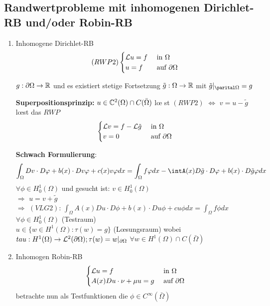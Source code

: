 \subsection{Randwertprobleme mit inhomogenen Dirichlet-RB und/oder Robin-RB}
\begin{enumerate}
  \item Inhomogene Dirichlet-RB\\
    \[(RWP2)\begin{cases}
    \mathcal{L} u=f & \mbox{ in }\Omega\\
    u=f & \mbox{ auf }\partial\Omega
    \end{cases}\]

    $g:\partial\Omega \rightarrow \mathbb{R}$ und es existiert stetige Fortsetzung
    $\tilde g:\Omega\rightarrow \mathbb{R}$ mit $\tilde g|_{\parital\Omega}=g$

    \textbf{Superpositionsprinzip:} $u\in\mathbb{C}^2(\Omega)\cap C(\bar\Omega)$ l\oe
    st $(RWP2)$ $\Leftrightarrow$
    $v=u-\tilde g$ l\oe st das $RWP$
    \[\begin{cases}
    \mathcal{L} v=f-\mathcal{L}\tilde g & \mbox{ in }\Omega\\
    v=0 & \mbox{ auf }\partial\Omega
    \end{cases}\]

    \textbf{Schwach Formulierung}:
    \[\int_\Omega Dv\cdot D\phi+b(x)\cdot Dv\phi +c(x)v\phi dx =\int_\Omega
    f\phi dx - \intA(x)D\tilde g \cdot D\phi + b(x)\cdot D\tilde g \phi dx\]
    $\forall \phi \in H^1_0(\Omega)$ und gesucht ist: $v\in H^1_0(\Omega)$\\
    $\Rightarrow$ $u=v+\tilde g$\\
    $\Rightarrow$ $(VLG 2)$: $\int_\Omega A(x)Du\cdot D\phi+b(x)\cdot Du \phi+ 
    cu\phi dx = \int_\Omega f\phi dx$ $\forall \phi\in H^1_0(\Omega)$ 
    (Testraum)\\
    $u\in \{ w\in H^1(\Omega) : \tau(w)=g \}$ (L\oe sungsraum) wobei
    $tau:H^1(\Omega)\rightarrow \mathcal{L}^2(\partial\Omega);
    \tau(w)=w|_{\partial\Omega}$ $\forall w\in H^1(\Omega)\cap C(\bar \Omega)$
  \item Inhomogen Robin-RB\\
    \[\begin{cases}
    \mathcal{L} u=f & \mbox{ in }\Omega\\
      A(x)Du\cdot \nu+\mu u=g & \mbox{ auf }\partial\Omega
    \end{cases}\]
    betrachte nun als Testfunktionen die $\phi\in C^\infty(\bar\Omega)$

\end{enumerate}



